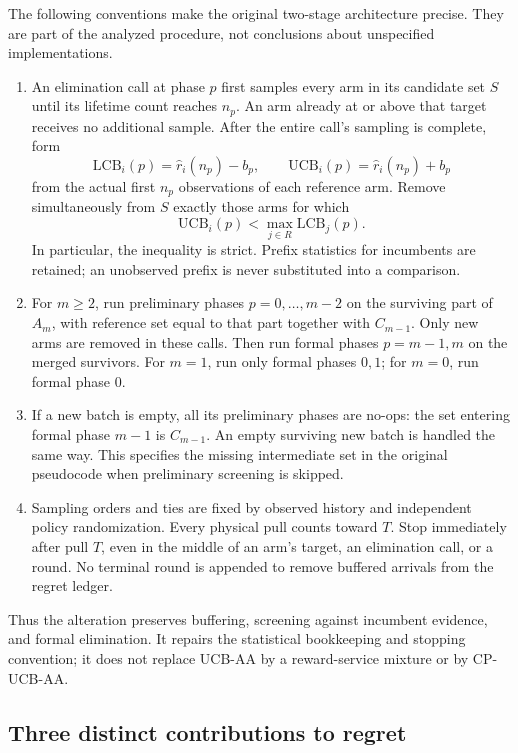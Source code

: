 The following conventions make the original two-stage architecture precise.
They are part of the analyzed procedure, not conclusions about unspecified
implementations.
\begin{enumerate}
 \item An elimination call at phase $p$ first samples every arm in its
 candidate set $S$ until its lifetime count reaches $n_p$. An arm already
 at or above that target receives no additional sample. After the entire
 call's sampling is complete, form
 \[
  \mathrm{LCB}_i(p)=\hat r_i(n_p)-b_p,\qquad
  \mathrm{UCB}_i(p)=\hat r_i(n_p)+b_p
 \]
 from the actual first $n_p$ observations of each reference arm.
 Remove simultaneously from $S$ exactly those arms for which
 \[
  \mathrm{UCB}_i(p)<\max_{j\in R}\mathrm{LCB}_j(p).
 \]
 In particular, the inequality is strict. Prefix statistics for incumbents
 are retained; an unobserved prefix is never substituted into a comparison.
 \item For $m\ge2$, run preliminary phases $p=0,\ldots,m-2$ on the
 surviving part of $A_m$, with reference set equal to that part together
 with $C_{m-1}$. Only new arms are removed in these calls. Then run formal
 phases $p=m-1,m$ on the merged survivors. For $m=1$, run only formal
 phases $0,1$; for $m=0$, run formal phase $0$.
 \item If a new batch is empty, all its preliminary phases are no-ops:
 the set entering formal phase $m-1$ is $C_{m-1}$. An empty surviving new
 batch is handled the same way. This specifies the missing intermediate
 set in the original pseudocode when preliminary screening is skipped.
 \item Sampling orders and ties are fixed by observed history and
 independent policy randomization. Every physical pull counts toward
 $T$. Stop immediately after pull $T$, even in the middle of an arm's
 target, an elimination call, or a round. No terminal round is appended
 to remove buffered arrivals from the regret ledger.
\end{enumerate}

Thus the alteration preserves buffering, screening against incumbent
evidence, and formal elimination. It repairs the statistical bookkeeping
and stopping convention; it does not replace UCB-AA by a reward-service
mixture or by CP-UCB-AA.

\subsection{Three distinct contributions to regret}

